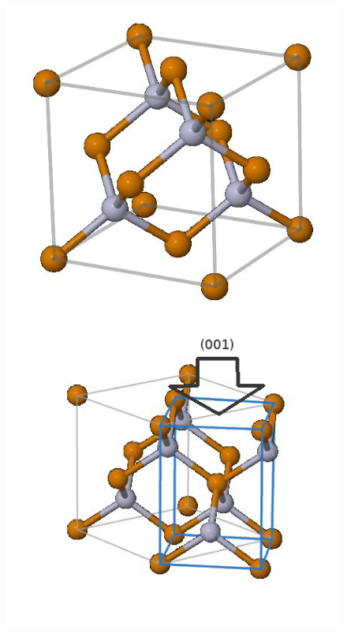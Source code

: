 	\begin{figure}[tbp]
		\begin{minipage}[c]{.32\linewidth}
			\centering
			\includegraphics[width=0.9\linewidth]{andere_bilder/zinc_blende.jpg}
		\end{minipage}
		\hfill
		\begin{minipage}[c]{.32\linewidth}
			\centering
			\includegraphics[width=\linewidth]{andere_bilder/zinc_blende_45degree.jpg}

\end{minipage}
\end{figure}
